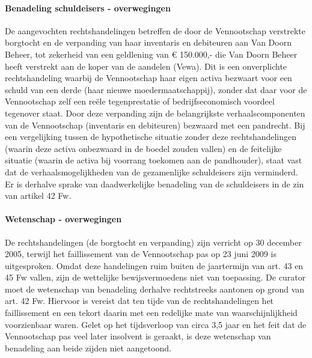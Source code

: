 \documentclass[
  dutch,
  a4paper,
]{article}
\begin{document}
\paragraph{Benadeling schuldeisers - overwegingen}\label{benadeling-schuldeisers---overwegingen-8}

De aangevochten rechtshandelingen betreffen de door de Vennootschap verstrekte borgtocht en de verpanding van haar inventaris en debiteuren aan Van Doorn Beheer, tot zekerheid van een geldlening van € 150.000,- die Van Doorn Beheer heeft verstrekt aan de koper van de aandelen (Vewa). Dit is een onverplichte rechtshandeling waarbij de Vennootschap haar eigen activa bezwaart voor een schuld van een derde (haar nieuwe moedermaatschappij), zonder dat daar voor de Vennootschap zelf een reële tegenprestatie of bedrijfseconomisch voordeel tegenover staat. Door deze verpanding zijn de belangrijkste verhaalscomponenten van de Vennootschap (inventaris en debiteuren) bezwaard met een pandrecht. Bij een vergelijking tussen de hypothetische situatie zonder deze rechtshandelingen (waarin deze activa onbezwaard in de boedel zouden vallen) en de feitelijke situatie (waarin de activa bij voorrang toekomen aan de pandhouder), staat vast dat de verhaalsmogelijkheden van de gezamenlijke schuldeisers zijn verminderd. Er is derhalve sprake van daadwerkelijke benadeling van de schuldeisers in de zin van artikel 42 Fw.

\paragraph{Wetenschap - overwegingen}\label{wetenschap---overwegingen-8}

De rechtshandelingen (de borgtocht en verpanding) zijn verricht op 30 december 2005, terwijl het faillissement van de Vennootschap pas op 23 juni 2009 is uitgesproken. Omdat deze handelingen ruim buiten de jaartermijn van art. 43 en 45 Fw vallen, zijn de wettelijke bewijsvermoedens niet van toepassing. De curator moet de wetenschap van benadeling derhalve rechtstreeks aantonen op grond van art. 42 Fw. Hiervoor is vereist dat ten tijde van de rechtshandelingen het faillissement en een tekort daarin met een redelijke mate van waarschijnlijkheid voorzienbaar waren. Gelet op het tijdsverloop van circa 3,5 jaar en het feit dat de Vennootschap pas veel later insolvent is geraakt, is deze wetenschap van benadeling aan beide zijden niet aangetoond.

\newpage

\end{document}
